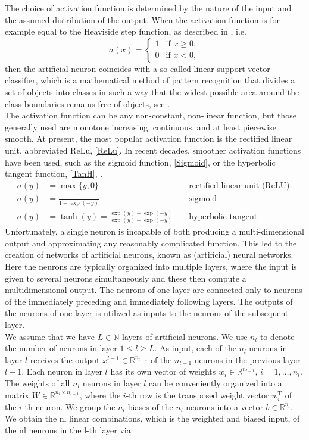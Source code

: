 The choice of activation function is determined by the nature of the input and the assumed distribution of the output. When the activation function is for example equal to the Heaviside step function, as described in \cite{Rosenblatt:1958}, i.e.
\begin{equation*}
    \sigma(x) = \begin{cases} 1 & \text{if } x \geq 0, \\ 0 & \text{if } x < 0, \end{cases}
\end{equation*}
then the artificial neuron coincides with a so-called linear support vector classifier, which is a mathematical method of pattern recognition that divides a set of objects into classes in such a way that the widest possible area around the class boundaries remains free of objects, see \cite[Chapter~7]{Bishop:2006}. \\
The activation function can be any non-constant, non-linear function, but those generally used are monotone increasing, continuous, and at least piecewise smooth. At present, the most popular activation function is the rectified linear unit, abbreviated ReLu, \cref{ReLu}. In recent decades, smoother activation functions have been used, such as the sigmoid function, \cref{Sigmoid}, or the hyperbolic tangent function, \cref{TanH}, \cite[p.~3]{LeCunBengioHinton:2015}.
\begin{align}
    \sigma(y) &=\max \{y, 0\} & & \text{ rectified linear unit (ReLU) } \label{ReLu} \\
    \sigma(y) &=\frac{1}{1+\exp (-y)} & & \text{ sigmoid } \label{Sigmoid} \\
    \sigma(y) &=\tanh (y)=\frac{\exp (y)-\exp (-y)}{\exp (y)+\exp (-y)} & & \text{ hyperbolic tangent } \label{TanH}
\end{align}
Unfortunately, a single neuron is incapable of both producing a multi-dimensional output and approximating any reasonably complicated function. This led to the creation of networks of artificial neurons, known as (artificial) neural networks. Here the neurons are typically organized into multiple layers, where the input is given to several neurons simultaneously and these then compute a multidimensional output. The neurons of one layer are connected only to neurons of the immediately preceding and immediately following layers. The outputs of the neurons of one layer is utilized as inputs to the neurons of the subsequent layer. \\
We assume that we have $L \in \mathbb{N}$ layers of artificial neurons. We use $n_l$ to denote the number of neurons in layer $1 \leq l \geq L$. As input, each of the $n_l$ neurons in layer $l$ receives the output $x^{l-1} \in \mathbb{R}^{n_{l-1}}$ of the $n_{l-1}$ neurons in the previous layer $l-1$. Each neuron in layer $l$ has its own vector of weights $w_i \in \mathbb{R}^{n_{l-1}}$, $i = 1, \ldots, n_l$. The weights of all $n_l$ neurons in layer $l$ can be conveniently organized into a matrix $W \in \mathbb{R}^{n_l \times n_{l-1}}$, where the $i$-th row is the transposed weight vector $w^{\mathrm{T}}_i$ of the $i$-th neuron. We group the $n_l$ biases of the $n_l$ neurons into a vector $b \in \mathbb{R}^{n_l}$. We obtain the nl linear combinations, which is the weighted and biased input, of the nl neurons in the l-th layer via 
